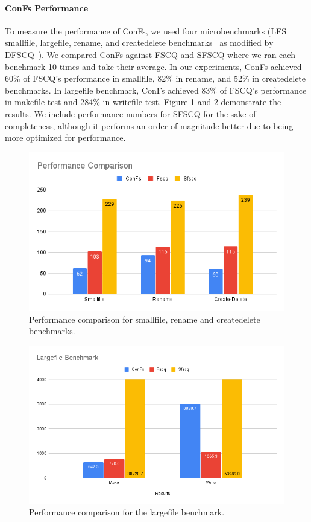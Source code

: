 \paragraph{ConFs Performance}
To measure the performance of ConFs, we used four microbenchmarks (LFS smallfile, largefile, rename, and createdelete
benchmarks~\cite{rosenblum:lfs} as modified by DFSCQ~\cite{chen:dfscq}). We compared ConFs against FSCQ and SFSCQ where we ran each benchmark 10 times and take their average. In our experiments, ConFs achieved 60\% of FSCQ's performance in smallfile, 82\% in rename, and 52\% in createdelete benchmarks. In largefile benchmark, ConFs achieved 83\% of FSCQ's performance in makefile test and 284\% in writefile test. Figure \ref{fig:Performance_Comparison} and \ref{fig:Performance_Comparison_Largfile} demonstrate the results. We include performance numbers for SFSCQ for the sake of completeness, although it performs an order of magnitude better due to being more optimized for performance.

\begin{figure}[H]
         \centering
          \includegraphics[scale=0.5]{templates/figures/Performance Comparison.png}
    \caption{Performance comparison for smallfile, rename and createdelete benchmarks.}
    \label{fig:Performance_Comparison}
\end{figure}

\begin{figure}[H]
    \centering
    \includegraphics[scale=0.5]{templates/figures/Largefile Benchmark.png}
    \caption{Performance comparison for the largefile benchmark.}
    \label{fig:Performance_Comparison_Largfile}
\end{figure}

